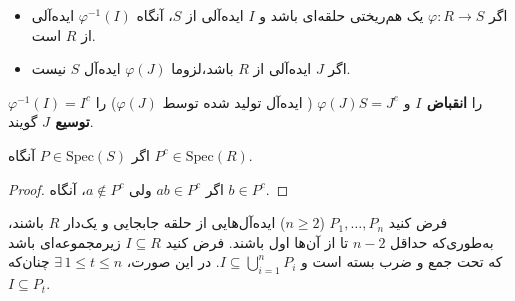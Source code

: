 \begin{tcolorbox}[colback=blue!5!white, colframe=blue!75!black, title={یادآوری}]

    \begin{itemize}
        \item اگر $\varphi: R \to S$ یک هم‌ریختی حلقه‌ای باشد و $I$ ایده‌آلی از $S$، آنگاه $\varphi^{-1}(I)$ ایده‌آلی از $R$ است.
        \item اگر $J$ ایده‌آلی از $R$ باشد،لزوما \(\varphi(J)\) ایده‌آل  \(S\) نیست.
    \end{itemize}



\end{tcolorbox}

\begin{tcolorbox}[colback=blue!5!white, colframe=blue!75!black, title={اصطلاحات رایج}]
    $\varphi^{-1}(I) = I^c$ را \textbf{انقباض   $I$} و $\varphi(J)S = J^e$ ({ ایده‌آل تولید شده توسط \(\varphi(J)\)}) را \textbf{ توسیع   $J$} گویند.
\end{tcolorbox}

\begin{theorem}
    اگر $P \in \mathrm{Spec}(S)$ آنگاه $P^c \in \mathrm{Spec}(R)$.
\end{theorem}

\begin{proof}
    اگر $ab \in P^c$ ولی $a \notin P^c$، آنگاه $b \in P^c$.
\end{proof}


\begin{theorem}
    فرض کنید $P_1, \dots, P_n$ (\(n \geq 2\)) ایده‌آل‌هایی از حلقه جابجایی و یک‌دار $R$ باشند، به‌طوری‌که حداقل $n-2$ تا از آن‌ها اول باشند. فرض کنید $I \subseteq R$ زیرمجموعه‌ای باشد که تحت جمع و ضرب بسته است و $I \subseteq \bigcup_{i=1}^n P_i$. در این صورت، $\exists\, 1 \le t \le n$ چنان‌که $I \subseteq P_t$.

\end{theorem}


